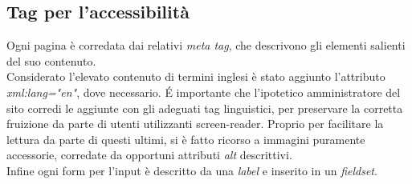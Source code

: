\documentclass{tecweb}
\begin{document}
	\subsection{Tag per l'accessibilità}
	Ogni pagina è corredata dai relativi \textit{meta tag}, che descrivono gli elementi salienti del suo contenuto. \\
	Considerato l'elevato contenuto di termini inglesi è stato aggiunto l'attributo \textit{xml:lang="en"}, dove necessario. \'E importante che l'ipotetico amministratore del sito corredi le aggiunte con gli adeguati tag linguistici, per preservare la corretta fruizione da parte di utenti utilizzanti screen-reader. Proprio per facilitare la lettura da parte di questi ultimi, si è fatto ricorso a immagini puramente accessorie, corredate da opportuni attributi \textit{alt} descrittivi. \\
	Infine ogni form per l'input è descritto da una \textit{label} e inserito in un \textit{fieldset}.
\end{document}
